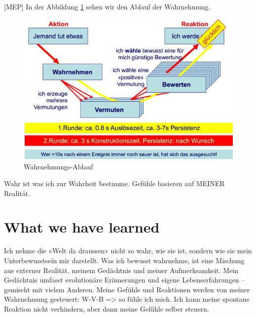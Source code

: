 [MEP] In der Abbildung \ref{fig:wahrnehmung-ablauf} sehen wir den Ablauf der Wahrnehmung.

\begin{figure}[h!]
\centering
\includegraphics[width=0.7\linewidth]{fig/wahrnehmung-ablauf}
\caption{Wahrnehmungs-Ablauf}
\label{fig:wahrnehmung-ablauf}
\end{figure}

Wahr ist was ich zur Wahrheit bestimme. Gefühle basieren auf MEINER Realität.

\section{What we have learned}
Ich nehme die «Welt da draussen» nicht so wahr, wie sie ist, sondern wie sie mein Unterbewusstsein mir darstellt. Was ich bewusst wahrnehme, ist eine Mischung aus externer Realität, meinem Gedächtnis und meiner
Aufmerksamkeit. Mein Gedächtnis umfasst evolutionäre Erinnerungen und
eigene Lebenserfahrungen – gemischt mit vielem Anderen. Meine Gefühle und Reaktionen werden von meiner Wahrnehmung gesteuert: W-V-B => so fühle ich mich. Ich kann meine spontane Reaktion nicht verhindern, aber dann meine Gefühle selber steuern.
